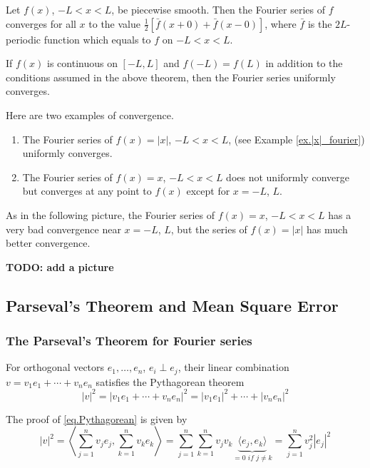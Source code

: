 \begin{theorem}\label{th.convergence}
Let $f(x)$, $-L<x<L$, be piecewise smooth. Then the Fourier series of $f$ converges for all $x$ to the value $\frac{1}{2}[\bar{f}(x+0)+\bar{f}(x-0)]$, where $\bar{f}$ is the $2 L$-periodic function which equals to $f$ on $-L<x<L$.

If $f(x)$ is continuous on $[-L, L]$ and $f(-L)=f(L)$ in addition to the conditions assumed in the above theorem, then the Fourier series uniformly converges.
\end{theorem}

\begin{example}[] Here are two examples of convergence.

    \begin{enumerate}
        \item The Fourier series of $f(x)=|x|$, $-L<x<L$, (see Example \ref{ex.|x|_fourier}) uniformly converges. 
        
        \item The Fourier series of $f(x)=x$, $-L<x<L$ does not uniformly converge but converges at any point to $f(x)$ except for $x = -L$, $L$. 
    \end{enumerate}

    As in the following picture, the Fourier series of $f(x)=x$, $-L<x<L$ has a very bad convergence near $x = -L$, $L$, but the series of $f(x)=|x|$ has much better convergence.

    \textbf{TODO: add a picture}
\end{example}

\subsection{Parseval's Theorem and Mean Square Error}

\subsubsection{The Parseval's Theorem for Fourier series}

For orthogonal vectors $e_1,\dots, e_{n}$, $e_i\perp e_j$, their linear combination $v = v_1 e_1+\cdots+v_n e_n$ satisfies the Pythagorean theorem
\begin{equation}\label{eq.Pythagorean}
    |v|^2 = |v_1 e_1+\cdots+v_n e_n|^2 = |v_1 e_1|^2+\cdots+|v_n e_n|^2
\end{equation}

The proof of \eqref{eq.Pythagorean} is given by 
\begin{equation*}
    |v|^2 = \left\langle\sum_{j = 1}^{n}v_j e_j, \sum_{k = 1}^{n}v_k e_k\right\rangle = \sum_{j = 1}^{n}\sum_{k = 1}^{n}v_jv_k\underbrace{\langle e_j, e_k\rangle}_{= 0\textit{ if }j\neq k} = \sum_{j = 1}^{n}v_j^2 |e_j|^2
\end{equation*}


